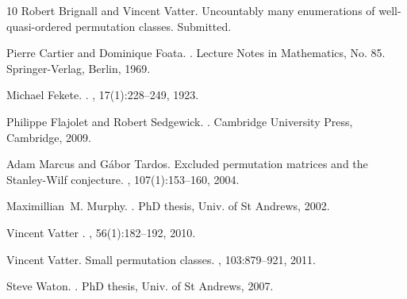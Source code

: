 \documentclass[11pt,a4paper]{article}
\theoremstyle{definition}
\begin{document}
\begin{thebibliography}{10}
Robert Brignall and Vincent Vatter.
\newblock Uncountably many enumerations of well-quasi-ordered permutation
  classes.
\newblock Submitted.

Pierre Cartier and Dominique Foata.
.
\newblock Lecture Notes in Mathematics, No. 85. Springer-Verlag, Berlin, 1969.

Michael Fekete.
.
, 17(1):228–249, 1923.

Philippe Flajolet and Robert Sedgewick.
.
\newblock Cambridge University Press, Cambridge, 2009.

Adam Marcus and G{\'a}bor Tardos.
\newblock Excluded permutation matrices and the {S}tanley-{W}ilf conjecture.
, 107(1):153--160, 2004.

Maximillian~M. Murphy.
.
\newblock PhD thesis, Univ. of St Andrews, 2002.

Vincent Vatter
.
, 56(1):182–192, 2010.

Vincent Vatter.
\newblock Small permutation classes.
, 103:879--921, 2011.

Steve Waton.
.
\newblock PhD thesis, Univ. of St Andrews, 2007.


\end{thebibliography}

%
%
\end{document}
